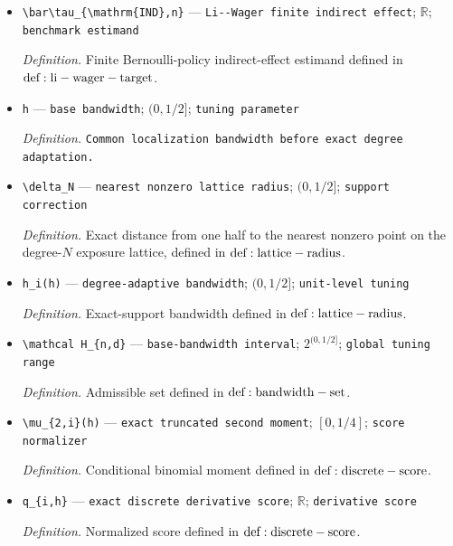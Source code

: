 \documentclass{article}
\begin{document}
\begin{itemize}
  \item \texttt{\textbackslash{}\allowbreak{}bar\textbackslash{}\allowbreak{}tau\_\allowbreak{}\{\textbackslash{}\allowbreak{}mathrm\{IND\}\allowbreak{},\allowbreak{}n\}\allowbreak{}} --- \texttt{Li-\allowbreak{}-\allowbreak{}Wager finite indirect effect}; \(\mathbb R\); \texttt{benchmark estimand}
  \par\smallskip\noindent\emph{Definition.} Finite Bernoulli-policy indirect-effect estimand defined in \({\rm def:li-wager-target}\).
  \item \texttt{h} --- \texttt{base bandwidth}; \((0,1/2]\); \texttt{tuning parameter}
  \par\smallskip\noindent\emph{Definition.} \texttt{Common localization bandwidth before exact degree adaptation.}
  \item \texttt{\textbackslash{}\allowbreak{}delta\_\allowbreak{}N} --- \texttt{nearest nonzero lattice radius}; \((0,1/2]\); \texttt{support correction}
  \par\smallskip\noindent\emph{Definition.} Exact distance from one half to the nearest nonzero point on the degree-\(N\) exposure lattice, defined in \({\rm def:lattice-radius}\).
  \item \texttt{h\_\allowbreak{}i(h)} --- \texttt{degree-\allowbreak{}adaptive bandwidth}; \((0,1/2]\); \texttt{unit-\allowbreak{}level tuning}
  \par\smallskip\noindent\emph{Definition.} Exact-support bandwidth defined in \({\rm def:lattice-radius}\).
  \item \texttt{\textbackslash{}\allowbreak{}mathcal H\_\allowbreak{}\{n,\allowbreak{}d\}\allowbreak{}} --- \texttt{base-\allowbreak{}bandwidth interval}; \(2^{(0,1/2]}\); \texttt{global tuning range}
  \par\smallskip\noindent\emph{Definition.} Admissible set defined in \({\rm def:bandwidth-set}\).
  \item \texttt{\textbackslash{}\allowbreak{}mu\_\allowbreak{}\{2,\allowbreak{}i\}\allowbreak{}(h)} --- \texttt{exact truncated second moment}; \([0,1/4]\); \texttt{score normalizer}
  \par\smallskip\noindent\emph{Definition.} Conditional binomial moment defined in \({\rm def:discrete-score}\).
  \item \texttt{q\_\allowbreak{}\{i,\allowbreak{}h\}\allowbreak{}} --- \texttt{exact discrete derivative score}; \(\mathbb R\); \texttt{derivative score}
  \par\smallskip\noindent\emph{Definition.} Normalized score defined in \({\rm def:discrete-score}\).

\end{itemize}
\end{document}
